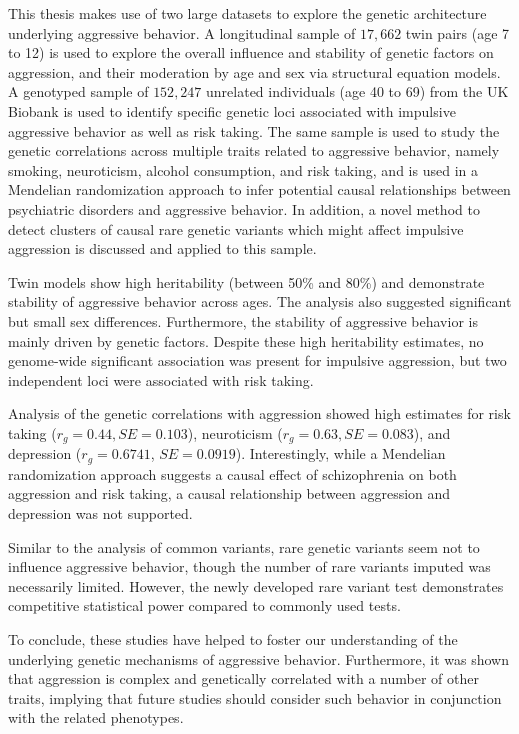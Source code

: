 \documentclass[header.tex]{subfiles}
\begin{document}
This thesis makes use of two large datasets to explore the genetic architecture underlying aggressive behavior.
A longitudinal sample of $17,662$ twin pairs (age 7 to 12) is used to explore the overall influence and stability of genetic factors on aggression, and their moderation by  age and sex  via structural equation models.
A genotyped sample of $152,247$ unrelated individuals (age 40 to 69) from the UK Biobank is used to identify specific genetic loci associated with impulsive aggressive behavior as well as risk taking.
The same sample is  used to study the genetic correlations across multiple traits related to aggressive behavior, namely smoking, neuroticism, alcohol consumption, and risk taking, and is used in a Mendelian randomization approach to infer potential causal relationships between psychiatric disorders and aggressive behavior.
In addition, a novel method to detect clusters of causal rare genetic variants which might affect impulsive aggression is discussed and applied to this sample. 

Twin models show high heritability (between 50\% and 80\%) and demonstrate stability of aggressive behavior across ages.
The analysis also suggested significant but small sex differences.
Furthermore, the stability of aggressive behavior is mainly driven by genetic factors.
Despite these high heritability estimates, no genome-wide significant association was present for impulsive aggression, but two independent loci were associated with risk taking.

Analysis of the genetic correlations with aggression showed high estimates for risk taking ($r_g=0.44, SE=0.103$), neuroticism ($r_g=0.63, SE=0.083$), and depression ($r_g=0.6741$, $SE=0.0919$).
Interestingly, while a Mendelian randomization approach suggests a causal effect of schizophrenia on both aggression and risk taking, a causal relationship between aggression and depression was not supported.

Similar to the analysis of common variants, rare genetic variants seem not to influence aggressive behavior, though the number of rare variants imputed was necessarily limited.
However, the newly developed rare variant test demonstrates competitive statistical power compared to commonly used tests.

To conclude, these studies have helped to foster our understanding of the underlying genetic mechanisms of aggressive behavior.
Furthermore, it was shown that aggression is complex and genetically correlated with a number of other traits,
implying that future studies should consider  such behavior in conjunction with the related phenotypes.     
\end{document}
